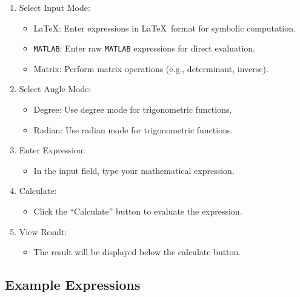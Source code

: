 \documentclass{article}
\begin{document}
\begin{enumerate}
\def\labelenumi{\arabic{enumi}.}
\item Select Input Mode:

  \begin{itemize}
  \item \LaTeX: Enter expressions in \LaTeX \, format for symbolic computation.
  \item \texttt{MATLAB}: Enter raw \texttt{MATLAB} expressions for direct evaluation.
  \item Matrix: Perform matrix operations (e.g., determinant, inverse).
  \end{itemize}

\item Select Angle Mode:

  \begin{itemize}
  \item Degree: Use degree mode for trigonometric functions.
  \item Radian: Use radian mode for trigonometric functions.
  \end{itemize}

\item Enter Expression:

  \begin{itemize}
  \item In the input field, type your mathematical expression.
  \end{itemize}

\item Calculate:

  \begin{itemize}
  \item Click the ``Calculate'' button to evaluate the expression.
  \end{itemize}

\item View Result:

  \begin{itemize}
  \item The result will be displayed below the calculate button.
  \end{itemize}
\end{enumerate}

\subsection{Example Expressions}

\noindent
\end{document}
